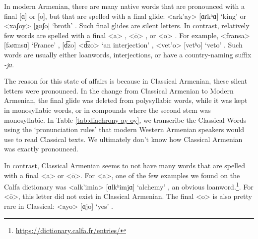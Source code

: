 {	In modern Armenian, there are many native words that are pronounced with a final [ɑ] or [o], but that are spelled with a final glide: <ark'ay> [ɑɾkʰɑ] `king'   or  <xaʃoy> [χɑʃo]   `broth' . Such final glides are silent letters.  In contrast, relatively few words are spelled with a final <a> , <ō> , or <o> . For example,  <fransa> [fəɾɑnsɑ] `France' , [d͡zo] <d͡zo> `an interjection'  ,  <vet'o> [vetʰo] `veto' . Such words are usually either loanwords, interjections,  or have a country-naming suffix \textit{-jɑ}. 
	
	The reason for this state of affairs is because in Classical Armenian, these silent letters were pronounced. In the change from Classical Armenian to Modern Armenian, the final glide was deleted from polysyllabic words, while it was kept in monosyllabic words, or in compounds where the second stem was monosyllabic. In Table \ref{tab:diachrony ay oy}, we transcribe the Classical Words using the `pronunciation rules' that modern  Western Armenian speakers would use to read   Classical texts. We ultimately don't know how Classical Armenian was exactly pronounced. 
	
	\begin{table}[H]
		\centering
		\caption{Diachronic loss of final glides for polysyllabic words}
		\label{tab:diachrony ay oy}
		\end{table}
	
	In contrast, Classical Armenian seems to not have many words that are spelled with a final <a> or <ō>. For <a>, one of the few examples we found on the Calfa dictionary was <alk'imia> [ɑlkʰimjɑ] `alchemy' , an obvious loanword.\footnote{\url{https://dictionary.calfa.fr/entries/}}. For <ō>, this letter did not exist in Classical Armenian. The final <o>  is also pretty rare in Classical: <ayo> [ɑjo] `yes' . 
	
}
